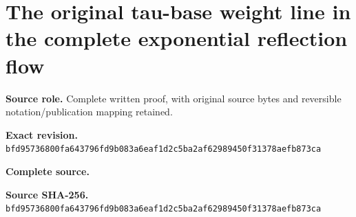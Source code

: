 \begingroup
\sloppy
\small
\section{The original tau-base weight line in the complete exponential reflection flow}
\noindent\textbf{Source role.} Complete written proof, with original source bytes and reversible notation/publication mapping retained.\par
\noindent\textbf{Exact revision.} \nolinkurl{bfd95736800fa643796fd9b083a6eaf1d2c5ba2af62989450f31378aefb873ca}\par
\noindent\textbf{Complete source.} \par
\noindent\textbf{Source SHA-256.} \nolinkurl{bfd95736800fa643796fd9b083a6eaf1d2c5ba2af62989450f31378aefb873ca}\par\medskip

\endgroup
